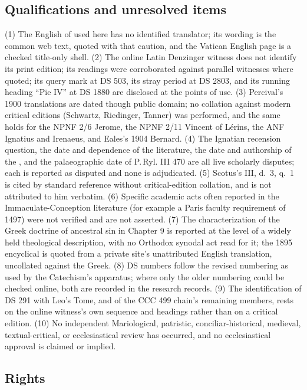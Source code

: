 \subsection*{Qualifications and unresolved items}

(1) The English of  used here has no identified
translator; its wording is the common web text, quoted with that caution,
and the Vatican English page is a checked title-only shell. (2) The
online Latin Denzinger witness does not identify its print edition; its
readings were corroborated against parallel witnesses where quoted; its
query mark at DS 503, its stray period at DS 2803, and its running
heading ``Pie IV'' at DS 1880 are disclosed at the points of use.
(3) Percival's 1900 translations are dated though public domain; no
collation against modern critical editions (Schwartz, Riedinger, Tanner)
was performed, and the same holds for the NPNF 2/6 Jerome, the NPNF 2/11
Vincent of L\'erins, the ANF Ignatius and Irenaeus, and Eales's 1904
Bernard. (4) The Ignatian recension question, the date and dependence of
the  literature, the date and authorship of the
, and the palaeographic date of P.\,Ryl. III
470 are all live scholarly disputes; each is reported as disputed and
none is adjudicated. (5) Scotus's  III, d.~3, q.~1 is
cited by standard reference without critical-edition collation, and
 is not attributed to him verbatim.
(6) Specific academic acts often reported in the Immaculate-Conception
literature (for example a Paris faculty requirement of 1497) were not
verified and are not asserted. (7) The characterization of the Greek
doctrine of ancestral sin in Chapter 9 is reported at the level of a
widely held theological description, with no Orthodox synodal act read
for it; the 1895 encyclical is quoted from a private site's unattributed
English translation, uncollated against the Greek. (8) DS numbers follow
the revised numbering as used by the Catechism's apparatus; where only
the older numbering could be checked online, both are recorded in the
research records. (9) The identification of DS 291 with Leo's Tome, and
of the CCC 499 chain's remaining members, rests on the online witness's
own sequence and headings rather than on a critical edition. (10) No
independent Mariological, patristic, conciliar-historical, medieval,
textual-critical, or ecclesiastical review has occurred, and no
ecclesiastical approval is claimed or implied.

\subsection*{Rights}

